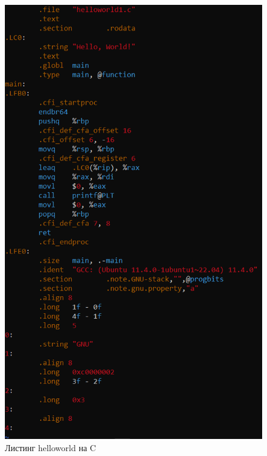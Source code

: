 \documentclass[a4paper,12pt]{article}
\begin{document}
\begin{figure}[h]
  \centering
  \includegraphics[width=0.8\linewidth]{images/asm0_2.png}
  \caption{Листинг helloworld на C}
\end{figure}
\end{document}
